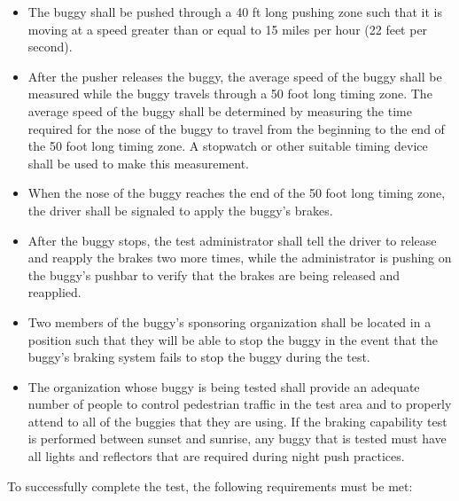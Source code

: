 	\begin{itemize}

		\item
		The buggy shall be pushed through a 40 ft long pushing zone such that it is moving at a speed greater than or equal to 15 miles per hour (22 feet per second).


		\item
		After the pusher releases the buggy, the average speed of the buggy shall be measured while the buggy travels through a 50 foot long timing zone. The average speed of the buggy shall be determined by measuring the time required for the nose of the buggy to travel from the beginning to the end of the 50 foot long timing zone. A stopwatch or other suitable timing device shall be used to make this measurement.

		\item
		When the nose of the buggy reaches the end of the 50 foot long timing zone, the driver shall be signaled to apply the buggy's brakes.

		\item
		After the buggy stops, the test administrator shall tell the driver to release and reapply the brakes two more times, while the administrator is pushing on the buggy's pushbar to verify that the brakes are being released and reapplied.

		\item
		Two members of the buggy's sponsoring organization shall be located in a position such that they will be able to stop the buggy in the event that the buggy's braking system fails to stop the buggy during the test.

		\item
		The organization whose buggy is being tested shall provide an adequate number of people to control pedestrian traffic in the test area and to properly attend to all of the buggies that they are using. If the braking capability test is performed between sunset and sunrise, any buggy that is tested must have all lights and reflectors that are required during night push practices.


	\end{itemize}

	To successfully complete the test, the following requirements must be met:

